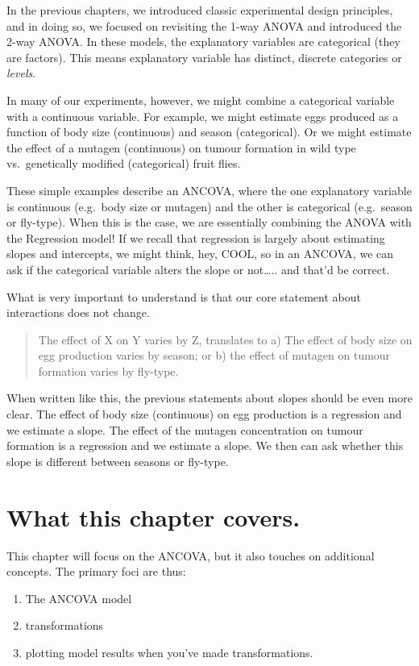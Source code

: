 \documentclass[
]{book}
\providecommand{\tightlist}{%
  \setlength{\itemsep}{0pt}\setlength{\parskip}{0pt}}
\begin{document}
In the previous chapters, we introduced classic experimental design principles, and in doing so, we focused on revisiting the 1-way ANOVA and introduced the 2-way ANOVA. In these models, the explanatory variables are categorical (they are factors). This means explanatory variable has distinct, discrete categories or \emph{levels}.

In many of our experiments, however, we might combine a categorical variable with a continuous variable. For example, we might estimate eggs produced as a function of body size (continuous) and season (categorical). Or we might estimate the effect of a mutagen (continuous) on tumour formation in wild type vs.~genetically modified (categorical) fruit flies.

These simple examples describe an ANCOVA, where the one explanatory variable is continuous (e.g.~body size or mutagen) and the other is categorical (e.g.~season or fly-type). When this is the case, we are essentially combining the ANOVA with the Regression model! If we recall that regression is largely about estimating slopes and intercepts, we might think, hey, COOL, so in an ANCOVA, we can ask if the categorical variable alters the slope or not\ldots.. and that'd be correct.

What is very important to understand is that our core statement about interactions does not change.

\begin{quote}
The effect of X on Y varies by Z, translates to a) The effect of body size on egg production varies by season; or b) the effect of mutagen on tumour formation varies by fly-type.
\end{quote}

When written like this, the previous statements about slopes should be even more clear. The effect of body size (continuous) on egg production is a regression and we estimate a slope. The effect of the mutagen concentration on tumour formation is a regression and we estimate a slope. We then can ask whether this slope is different between seasons or fly-type.

\section{What this chapter covers.}\label{what-this-chapter-covers.}

This chapter will focus on the ANCOVA, but it also touches on additional concepts. The primary foci are thus:

\begin{enumerate}
\def\labelenumi{\arabic{enumi}.}
\tightlist
\item
  The ANCOVA model
\item
  transformations
\item
  plotting model results when you've made transformations.
\end{enumerate}
\end{document}
